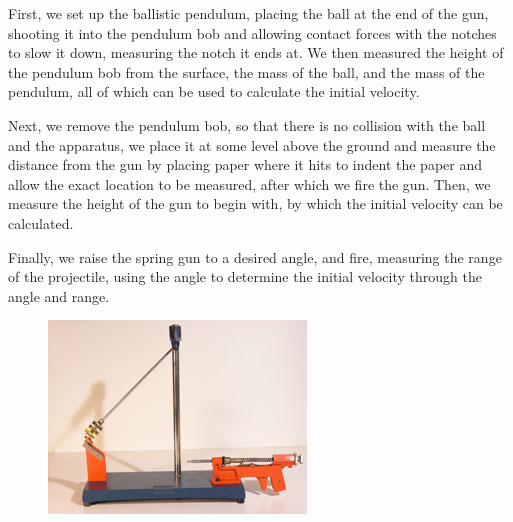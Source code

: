 \documentclass[11pt, titlepage]{article}
\begin{document}
First, we set up the ballistic pendulum, placing the ball at the end of the gun, shooting it into the pendulum bob and allowing contact forces with the notches to slow it down, measuring the notch it ends at. We then measured the height of the pendulum bob from the surface, the mass of the ball, and the mass of the pendulum, all of which can be used to calculate the initial velocity.

Next, we remove the pendulum bob, so that there is no collision with the ball and the apparatus, we place it at some level above the ground and measure the distance from the gun by placing paper where it hits to indent the paper and allow the exact location to be measured, after which we fire the gun. Then, we measure the height of the gun to begin with, by which the initial velocity can be calculated.

Finally, we raise the spring gun to a desired angle, and fire, measuring the range of the projectile, using the angle to determine the initial velocity through the angle and range. 

\begin{figure}[p]
\centering
\hspace*{-10.5cm}
\includegraphics[scale=0.15, angle=270]{lab2.jpg}
\vspace*{19cm}
\end{figure}
\end{document}
